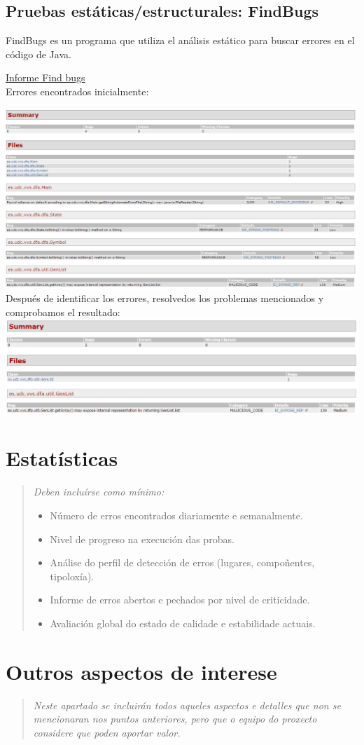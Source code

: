 \documentclass[DIV=calc,paper=a4,fontsize=11pt,onecolumn]{scrartcl} %
\newcommand{\hint}[1]{\begin{quote}\itshape #1 \end{quote}}
\begin{document}
	\subsection{Pruebas estáticas/estructurales: FindBugs}
	
	FindBugs es un programa que utiliza el análisis estático para buscar errores en el código de Java.
	
	\href{Informes/findBugs-report/findbugs.html}{Informe Find bugs} \\
	
	Errores encontrados inicialmente:
	
	\includegraphics[width=15cm]{Imagenes/findBugs1.png} \\
	
	Después de identificar los errores, resolvedos los problemas mencionados y comprobamos el resultado:\\
	
	\includegraphics[width=15cm]{Imagenes/findBugs2.png} \\

\section{Estatísticas}

\hint{Deben incluírse como mínimo:
  \begin{itemize}
    \item Número de erros encontrados diariamente e semanalmente.
    \item Nivel de progreso na execución das probas.
    \item Análise do perfil de detección de erros (lugares, compoñentes, tipoloxía).
    \item Informe de erros abertos e pechados por nivel de criticidade.
    \item Avaliación global do estado de calidade e estabilidade actuais.
  \end{itemize}}

\section{Outros aspectos de interese}

\hint{Neste apartado se incluirán todos aqueles aspectos e detalles que non se
  mencionaran nos puntos anteriores, pero que o equipo do proxecto considere que
  poden aportar valor.}
\end{document}
